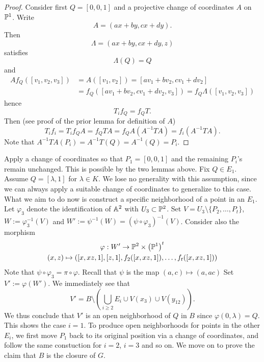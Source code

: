     \begin{proof}
        Consider first $Q=[0,0,1]$ and a projective change of coordinates $A$ on $\mathbb{P}^1$. Write 
        $$
            A = (ax+by,cx+dy).
        $$
        Then 
        $$
            \Lambda = (ax+by,cx+dy,z)
        $$
        satisfies 
        $$
            \Lambda(Q)=Q
        $$
        and 
        \begin{align*}
            A f_Q([v_1,v_2,v_3]) &= A([v_1,v_2]) = [av_1+bv_2,cv_1+dv_2]\\
             &= f_Q([av_1+bv_2,cv_1+dv_2,v_3])= f_Q \Lambda([v_1,v_2,v_3]) 
        \end{align*}
        hence 
        $$
            T_i f_Q = f_Q T.  
        $$
        Then (see proof of the prior lemma for definition of $A$)
        $$
            T_i f_i= T_i f_Q A= f_Q TA = f_Q A (A^{-1}TA)= f_i (A^{-1}TA).
        $$ 
        Note that $A^{-1}TA(P_i)=A^{-1}T(Q)=A^{-1}(Q)=P_i$.
    \end{proof}
    Apply a change of coordinates so that $P_1 = [0,0,1]$ and the remaining $P_i$'s remain unchanged. This is possible by the two lemmas above. Fix $Q\in E_1$. Assume $Q=[\lambda,1]$ for $\lambda\in K$.  We lose no generality with this assumption, since we can always apply a suitable change of coordinates to generalize to this case.\\ 
    What we aim to do now is construct a specific neighborhood of a point in an $E_1$.  Let $\varphi_3$ denote the identification of $\mathbb{A}^2$ with $U_3\subset \mathbb{P}^2$. Set $V=U_3\setminus\{P_2,\dots,P_t\}$, $W:= \varphi_3^{-1}(V)$ and $W' := \psi^{-1}(W) = (\psi\circ \varphi_3)^{-1}(V)$. Consider also the morphism
    \begin{gather*}
        \varphi : W' \rightarrow \mathbb{P}^2\times \left(\mathbb{P}^1\right)^{t}\\
        (x,z) \mapsto ([x,xz,1], [z,1],f_2([x,xz,1]),\dots,f_t([x,xz,1]))
    \end{gather*}
    Note that $\psi\circ \varphi_3 =\pi \circ \varphi$. Recall that $\psi$ is the map $(a,c)\mapsto (a,ac)$ Set $V':= \varphi(W')$. We immediately see that 
    $$
        V' = B\setminus\left(\bigcup_{i\geq 2} E_i\cup V(x_3)\cup V(y_{12}) \right).
    $$
    We thus conclude that $V'$ is an open neighborhood of $Q$ in $B$ since $\varphi(0,\lambda)=Q$. This shows the case $i=1$. To produce open neighborhoods for points in the other $E_i$, we first move $P_1$ back to its original position via a change of coordinates, and follow the same constuction for $i=2$, $i=3$ and so on. We move on to prove the claim that $B$ is the closure of $G$.
